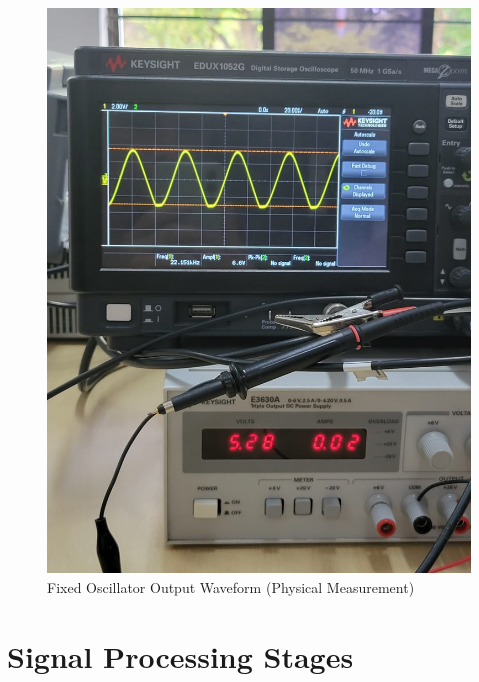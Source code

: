 \documentclass[conference]{IEEEtran}
\begin{document}
\begin{figure}[htbp]
    \centering
    \includegraphics[width=0.9\linewidth]{fixed.jpeg} %
    \caption{Fixed Oscillator Output Waveform (Physical Measurement)}
    \label{fig:Fixed_Oscillator}
\end{figure}

\section{Signal Processing Stages}
\end{document}
